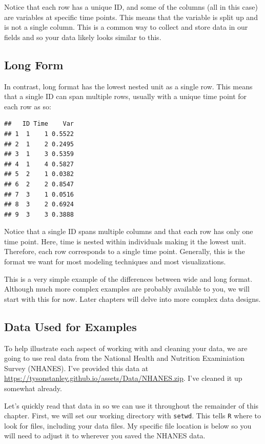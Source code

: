 \documentclass[]{tufte-book}
\theoremstyle{definition}
\theoremstyle{definition}
\theoremstyle{remark}
\begin{document}
Notice that each row has a unique ID, and some of the columns (all in
this case) are variables at specific time points. This means that the
variable is split up and is not a single column. This is a common way to
collect and store data in our fields and so your data likely looks
similar to this.

\subsection*{Long Form}\label{long-form}

In contrast, long format has the lowest nested unit as a single row.
This means that a single ID can span multiple rows, usually with a
unique time point for each row as so:

\begin{verbatim}
##   ID Time    Var
## 1  1    1 0.5522
## 2  1    2 0.2495
## 3  1    3 0.5359
## 4  1    4 0.5827
## 5  2    1 0.0382
## 6  2    2 0.8547
## 7  3    1 0.0516
## 8  3    2 0.6924
## 9  3    3 0.3888
\end{verbatim}

Notice that a single ID spans multiple columns and that each row has
only one time point. Here, time is nested within individuals making it
the lowest unit. Therefore, each row corresponds to a single time point.
Generally, this is the format we want for most modeling techniques and
most visualizations.

This is a very simple example of the differences between wide and long
format. Although much more complex examples are probably available to
you, we will start with this for now. Later chapters will delve into
more complex data designs.

\subsection*{Data Used for Examples}\label{data-used-for-examples}

To help illustrate each aspect of working with and cleaning your data,
we are going to use real data from the National Health and Nutrition
Examiniation Survey (NHANES). I've provided this data at
\url{https://tysonstanley.github.io/assets/Data/NHANES.zip}. I've
cleaned it up somewhat already.

Let's quickly read that data in so we can use it throughout the
remainder of this chapter. First, we will set our working directory with
\texttt{setwd}. This tells \texttt{R} where to look for files, including
your data files. My specific file location is below so you will need to
adjust it to wherever you saved the NHANES data.
\end{document}
